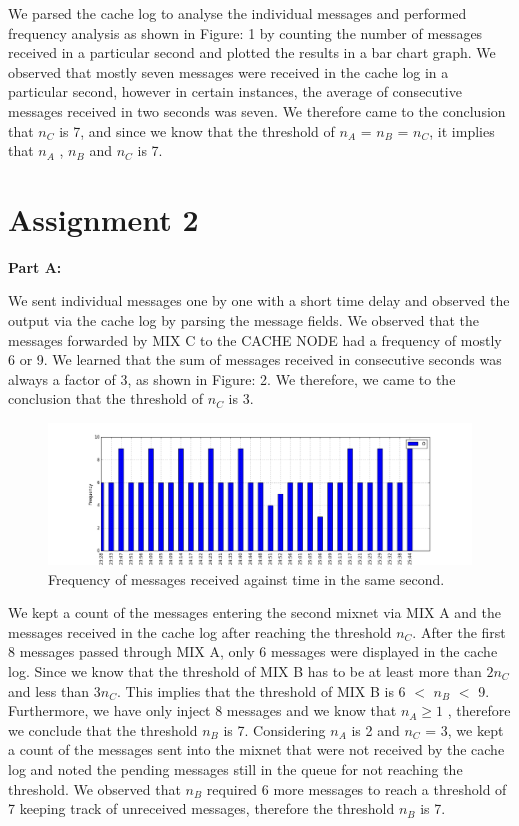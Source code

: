 \documentclass[preprint,12pt,3p]{elsarticle}
\begin{document}
We parsed the cache log to analyse the individual messages and performed frequency analysis as shown in Figure: 1 by counting the number of messages received in a particular second and plotted the results in a bar chart graph. We observed that mostly seven messages were received in the cache log in a particular second, however in certain instances, the average of consecutive messages received in two seconds was seven. We therefore came to the conclusion that $n_C$ is 7, and since we know that the threshold of $n_A$ = $n_B$ = $n_C$, it implies that $n_A$ , $n_B$ and $n_C$ is 7.

\section*{Assignment 2}
\textbf{Part A:}
\newline

We sent individual messages one by one with a short time delay and observed the output via the cache log by parsing the message fields. We observed that the messages forwarded by MIX C to the CACHE NODE had a frequency of mostly 6 or 9. We learned that the sum of messages received in consecutive seconds was always a factor of 3, as shown in Figure: 2. We therefore, we came to the conclusion that the threshold of $n_C$ is 3.
\newline
\begin{figure}[h]
\caption{Frequency of messages received against time in the same second.}
\centering
\includegraphics[width=\textwidth]{second}
\end{figure}
\newline
We kept a count of the messages entering the second mixnet via MIX A and the messages received in the cache log after reaching the threshold $n_C$. After the first 8 messages passed through MIX A, only 6 messages were displayed in the cache log. Since we know that the threshold of MIX B has to be at least more than $2n_C$ and less than $3n_C$. This implies that the threshold of MIX B is 6 $<$ $n_B$ $<$ 9. Furthermore, we have only inject 8 messages and we know that $n_A\geq 1$ , therefore we conclude that the threshold $n_B$ is 7.
\newline
Considering $n_A$ is 2 and $n_C$ = 3, we kept a count of the messages sent into the mixnet that were not received by the cache log and noted the pending messages still in the queue for not reaching the threshold. We observed that $n_B$ required 6 more messages to reach a threshold of 7 keeping  track of unreceived messages, therefore the threshold $n_B$ is 7.
\newline
\end{document}
